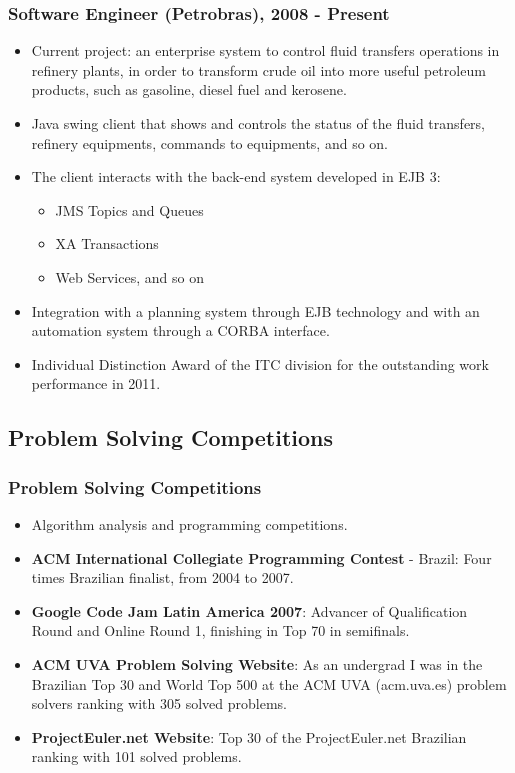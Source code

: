 \documentclass{beamer}
\begin{document}
\begin{frame}
	\frametitle{Software Engineer (Petrobras), 2008 - Present}
{
	\begin{itemize}
	  \item<1->Current project: an enterprise system to control fluid transfers operations in refinery plants, in order to transform crude oil into more useful petroleum 
products, such as gasoline, diesel fuel and kerosene. 
	  \item<2->Java swing client that shows and controls the status of the fluid
	  transfers, refinery equipments, commands to equipments, and so on. 
	  \item<3->The client interacts with the back-end system developed in EJB 3:
	  	\begin{itemize}
	  	  \item JMS Topics and Queues
	  	  \item XA Transactions
	  	  \item Web Services, and so on
	  	\end{itemize}
	 \item<4-> Integration with a planning system through EJB technology and with
	 an automation system through a CORBA interface.
	 \item<5-> Individual Distinction Award of the ITC division for the outstanding
	 work performance in 2011.
	\end{itemize}		 
}
\end{frame}

\subsection{Problem Solving Competitions}

\begin{frame}
	\frametitle{Problem Solving Competitions}
{
	\begin{itemize}
	  \item<1->Algorithm analysis and programming competitions.
	  \item<2->\textbf{ACM International Collegiate Programming Contest} - Brazil:
	  Four times Brazilian finalist, from 2004 to 2007.
	  \item<3->\textbf{Google Code Jam Latin America 2007}: Advancer of
	  Qualification Round and Online Round 1, finishing in Top 70 in semifinals.
	  \item<4->\textbf{ACM UVA Problem Solving Website}: As an undergrad I was in
	  the Brazilian Top 30 and World Top 500 at the ACM UVA (acm.uva.es) problem solvers ranking with 305 solved problems.
	  \item<5->\textbf{ProjectEuler.net Website}: Top 30 of the ProjectEuler.net
	  Brazilian ranking with 101 solved problems.
	\end{itemize}		 
}
\end{frame}
\end{document}
